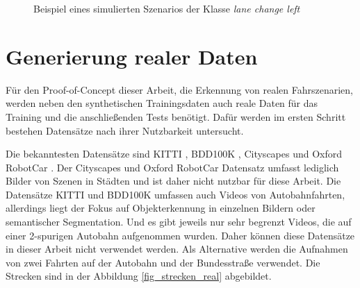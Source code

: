\begin{figure}[h]
\begin{tabular}{c c c c c}
\end{tabular}
\caption[Beispiel eines simulierten Szenarios der Klasse \textit{lane change left}]{Beispiel eines simulierten Szenarios der Klasse \textit{lane change left} \cite{ipg2018carmaker}}
\label{fig_beispiel_szenario_lcl}
\end{figure}

\section{Generierung realer Daten}
\label{umsetzung_daten_real}

Für den Proof-of-Concept dieser Arbeit, die Erkennung von realen Fahrszenarien, werden neben den synthetischen Trainingsdaten auch reale Daten für das Training und die anschließenden Tests benötigt. Dafür werden im ersten Schritt bestehen Datensätze nach ihrer Nutzbarkeit untersucht.

Die bekanntesten Datensätze sind KITTI \cite{geiger2013vision}, BDD100K \cite{yu2018bdd100k}, Cityscapes \cite{cordts2016cityscapes} und Oxford RobotCar \cite{maddern20171}. Der Cityscapes und Oxford RobotCar Datensatz umfasst lediglich Bilder von Szenen in Städten und ist daher nicht nutzbar für diese Arbeit. Die Datensätze KITTI und BDD100K umfassen auch Videos von Autobahnfahrten, allerdings liegt der Fokus auf Objekterkennung in einzelnen Bildern oder semantischer Segmentation. Und es gibt jeweils nur sehr begrenzt Videos, die auf einer 2-spurigen Autobahn aufgenommen wurden. Daher können diese Datensätze in dieser Arbeit nicht verwendet werden. Als Alternative werden die Aufnahmen von zwei Fahrten auf der Autobahn und der Bundesstraße verwendet. Die Strecken sind in der Abbildung \ref{fig_strecken_real} abgebildet. 


